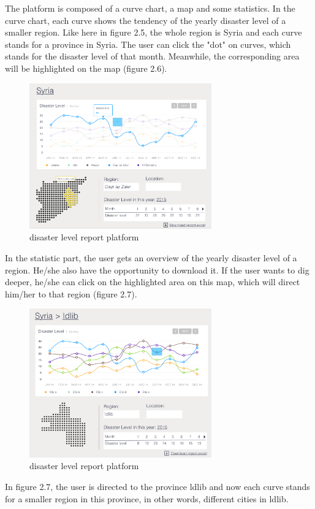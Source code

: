       The platform is composed of a curve chart,
      a map and some statistics.
      In the curve chart,
      each curve shows the tendency of the yearly disaster level of a smaller region.
      Like here in figure 2.5, 
      the whole region is Syria and each curve stands for a province in Syria.
      The user can click the "dot" on curves,
      which stands for the disaster level of that month.
      Meanwhile, the corresponding area will be highlighted on the map (figure 2.6).

      \begin{figure}[htp]
      \centering
      \includegraphics[width=0.7\textwidth]{figures/function-stakeholder-2}
      \caption{disaster level report platform}
      \label{fig:main-panel}
      \end{figure}

      In the statistic part,
      the user gets an overview of the yearly disaster level of a region.
      He/she also have the opportunity to download it.
      If the user wants to dig deeper, 
      he/she can click on the highlighted area on this map,
      which will direct him/her to that region (figure 2.7).

      \begin{figure}[htp]
      \centering
      \includegraphics[width=0.7\textwidth]{figures/function-stakeholder-3}
      \caption{disaster level report platform}
      \label{fig:main-panel}
      \end{figure}

      In figure 2.7,
      the user is directed to the province ldlib and now each curve stands for a smaller region in this province,
      in other words, different cities in ldlib.
    